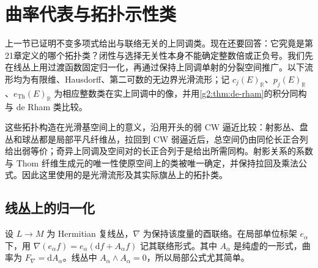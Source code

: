 
% 
% 

\section{曲率代表与拓扑示性类}
\label{g2:sec:2203}

上一节已证明不变多项式给出与联络无关的上同调类。现在还要回答：它究竟是第21章定义的哪个拓扑类？闭性与选择无关性本身不能确定整数倍或正负号。我们先在线丛上用过渡函数固定归一化，再通过保持上同调单射的分裂空间推广。以下流形均为有限维、Hausdorff、第二可数的无边界光滑流形；记 \(c_j(E)_{\mathbb R}\)、\(p_j(E)_{\mathbb R}\)、\(e_{\mathrm{Th}}(E)_{\mathbb R}\) 为相应整数类在实上同调中的像，并用\cref{g2:thm:de-rham}的积分同构与 de Rham 类比较。

这些拓扑构造在光滑基空间上的意义，沿用开头的弱 CW 逼近比较：射影丛、盘丛和球丛都是局部平凡纤维丛，拉回到 CW 弱逼近后，总空间仍由同伦长正合列给出弱等价；奇异上同调及空间对的长正合列于是给出所需同构。射影关系的系数与 Thom 纤维生成元的唯一性使原空间上的类被唯一确定，并保持拉回及乘法公式。因此这里使用的是光滑流形及其实际旗丛上的拓扑类。

\subsection{线丛上的归一化}
\label{g2:subsec:2203:01}
设 \(L\to M\) 为 Hermitian 复线丛，\(\nabla\) 为保持该度量的酉联络。在局部单位标架 \(e_\alpha\) 下，用 \(\nabla(e_\alpha f)=e_\alpha(\mathrm df+A_\alpha f)\) 记其联络形式。其中 \(A_\alpha\) 是纯虚的一形式，曲率为 \(F_\nabla=\mathrm dA_\alpha\)。线丛中 \(A_\alpha\wedge A_\alpha=0\)，所以局部公式尤其简单。

